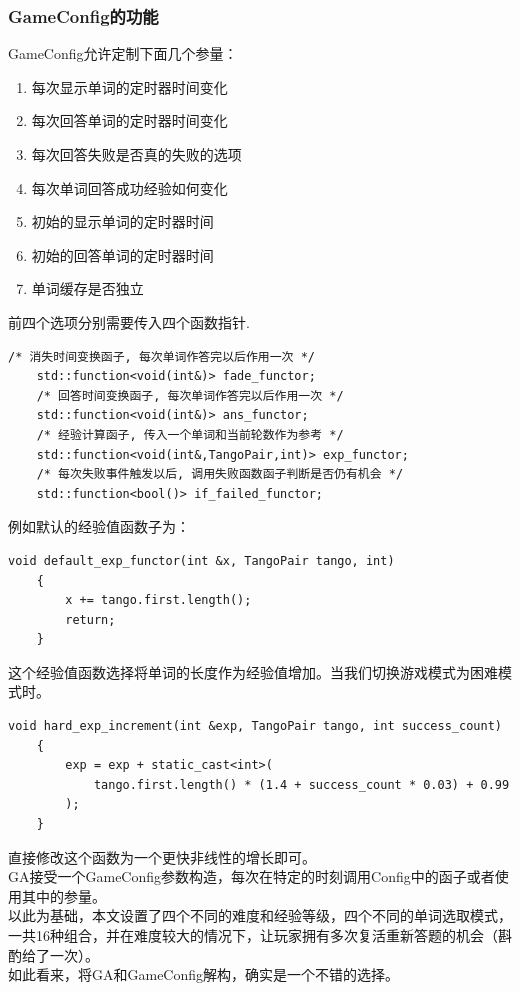 \documentclass[UTF8]{ctexart}
\begin{document}
\subsubsection{GameConfig的功能}
GameConfig允许定制下面几个参量：
\begin{enumerate}
    \item 每次显示单词的定时器时间变化
    \item 每次回答单词的定时器时间变化
    \item 每次回答失败是否真的失败的选项
    \item 每次单词回答成功经验如何变化
    \item 初始的显示单词的定时器时间
    \item 初始的回答单词的定时器时间
    \item 单词缓存是否独立
\end{enumerate}
前四个选项分别需要传入四个函数指针.
{\firacode
\begin{lstlisting}[language={[ANSI]C}]
    /* 消失时间变换函子, 每次单词作答完以后作用一次 */
    std::function<void(int&)> fade_functor;
    /* 回答时间变换函子, 每次单词作答完以后作用一次 */
    std::function<void(int&)> ans_functor;
    /* 经验计算函子, 传入一个单词和当前轮数作为参考 */
    std::function<void(int&,TangoPair,int)> exp_functor;
    /* 每次失败事件触发以后, 调用失败函数函子判断是否仍有机会 */
    std::function<bool()> if_failed_functor;
\end{lstlisting}
}
例如默认的经验值函数子为：
{\firacode
\begin{lstlisting}[language={[ANSI]C}]
    void default_exp_functor(int &x, TangoPair tango, int)
    {
        x += tango.first.length();
        return;
    }
\end{lstlisting}
}
这个经验值函数选择将单词的长度作为经验值增加。当我们切换游戏模式为困难模式时。
{\firacode
\begin{lstlisting}[language={[ANSI]C}]
    void hard_exp_increment(int &exp, TangoPair tango, int success_count)
    {
        exp = exp + static_cast<int>(
            tango.first.length() * (1.4 + success_count * 0.03) + 0.99
        );
    }
\end{lstlisting}
}
直接修改这个函数为一个更快非线性的增长即可。\\
\indent GA接受一个GameConfig参数构造，每次在特定的时刻调用Config中的函子或者使用其中的参量。\\
\indent 以此为基础，本文设置了四个不同的难度和经验等级，四个不同的单词选取模式，一共16种组合，并在难度较大的情况下，让玩家拥有多次复活重新答题的机会（斟酌给了一次）。\\
\indent 如此看来，将GA和GameConfig解构，确实是一个不错的选择。
\end{document}
